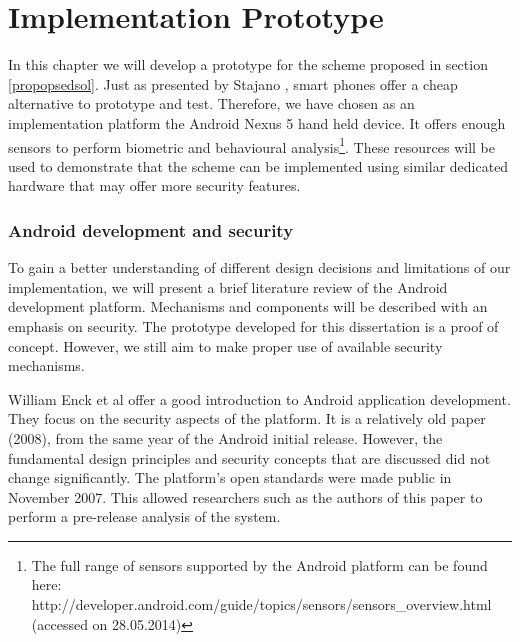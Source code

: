 
\chapter{Implementation Prototype} %

\label{Chapter4} %

In this chapter we will develop a prototype for the scheme proposed in section \ref{propopsedsol}. Just as presented by Stajano \cite{stajano2011pico}, smart phones offer a cheap alternative to prototype and test. Therefore, we have chosen as an implementation platform the Android Nexus 5 hand held device. It offers enough sensors to perform biometric and behavioural analysis\footnote{The full range of sensors supported by the Android platform can be found here: http://developer.android.com/guide/topics/sensors/sensors\_overview.html (accessed on 28.05.2014)}. These resources will be used to demonstrate that the scheme can be implemented using similar dedicated hardware that may offer more security features.

\subsection{Android development and security}
To gain a better understanding of different design decisions and limitations of our implementation, we will present a brief literature review of the Android development platform. Mechanisms and components will be described with an emphasis on security. The prototype developed for this dissertation is a proof of concept. However, we still aim to make proper use of available security mechanisms. 

William Enck et al \cite{enck2009understanding} offer a good introduction to Android application development. They focus on the security aspects of the platform. It is a relatively old paper (2008), from the same year of the Android initial release. However, the fundamental design principles and security concepts that are discussed did not change significantly. The platform's open standards were made public in November 2007. This allowed researchers such as the authors of this paper to perform a pre-release analysis of the system.

